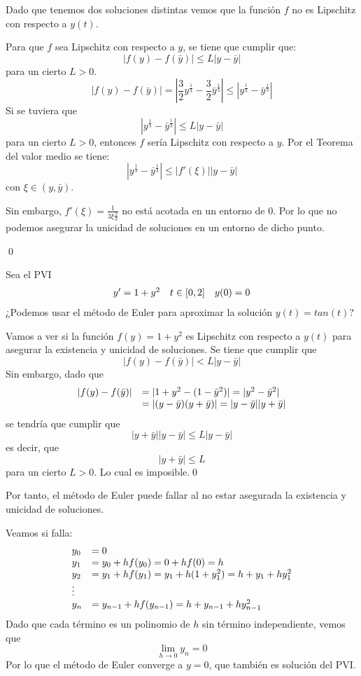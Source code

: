 \begin{itemize}
Dado que tenemos dos soluciones distintas vemos que la función $f$ no es Lipschitz con respecto a $y(t)$.

Para que $f$ sea Lipschitz con respecto a $y$, se tiene que cumplir que:
$$|f(y) - f(\bar{y})| \le L|y-\bar{y} |$$
para un cierto $L>0$.
$$|f(y) - f(\bar{y})| = |\frac{3}{2}y^{\frac{1}{3}} - \frac{3}{2}\bar{y}^{\frac{1}{3}}| \le |y^{\frac{1}{3}} - \bar{y}^{\frac{1}{3}}| $$
Si se tuviera que $$|y^{\frac{1}{3}} - \bar{y}^{\frac{1}{3}}| \le L|y -\bar{y}|$$ para un cierto $L>0$, entonces $f$ sería Lipschitz con respecto a $y$.
Por el Teorema del valor medio se tiene:
$$|y^{\frac{1}{3}} - \bar{y}^{\frac{1}{3}}| \le |f'(\xi)||y -\bar{y}|$$
con $\xi \in (y, \bar{y})$. 

Sin embargo, $f'(\xi) = \frac{1}{3\xi{\frac{2}{3}}}$ no está acotada en un entorno de 0. Por lo que no podemos asegurar la unicidad de soluciones en un entorno de dicho punto.
\end{itemize}
\qed


\begin{mathproblem}{3}
Sea el PVI
\begin{equation*}
\begin{array}{c c c}
y' = 1+y^2 & t\in [0,2] & y(0) = 0
\end{array}
\end{equation*}
¿Podemos usar el método de Euler para aproximar la solución $y(t) = tan(t)$?
\end{mathproblem}
Vamos a ver si la función $f(y) = 1+y^2$ es Lipschitz con respecto a $y(t)$ para asegurar la existencia y unicidad de soluciones.
Se tiene que cumplir que
$$|f(y) - f(\bar{y})| < L|y-\bar{y}|$$
Sin embargo, dado que
\begin{equation*}
\begin{array}{l l}
|f(y)-f(\bar{y})| & = |1+y^2-(1-\bar{y}^2)| = |y^2-\bar{y}^2|\\
& = |(y-\bar{y})(y+\bar{y})| = |y-\bar{y}||y+\bar{y}|
\end{array}
\end{equation*}
se tendría que cumplir que $$|y+\bar{y}||y-\bar{y}| \leq L|y-\bar{y}|$$
es decir, que 
$$|y+\bar{y}| \leq L $$
para un cierto $L>0$. Lo cual es imposible.\qed

Por tanto, el método de Euler puede fallar al no estar asegurada la existencia y unicidad de soluciones.

Veamos si falla:
\begin{equation*}
\begin{array}{l l}
y_0 & = 0\\
y_1 & = y_0+hf(y_0) = 0 + hf(0) = h\\
y_2 & = y_1+hf(y_1) = y_1 + h(1+y_1^2) = h + y_1 + hy_1^2\\
\vdots& \\
y_n & = y_{n-1}+hf(y_{n-1}) = h + y_{n-1} + hy_{n-1}^2
\end{array}
\end{equation*}
Dado que cada término es un polinomio de $h$ sin término independiente, vemos que $$\lim_{h\to 0} y_n = 0$$ Por lo que el método de Euler converge a $y=0$, que también es solución del PVI.


